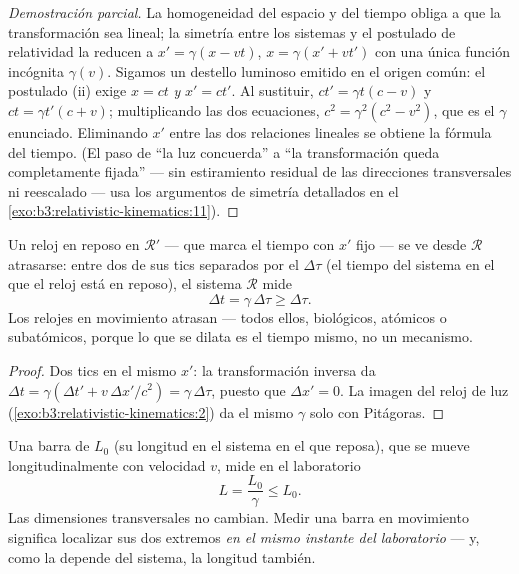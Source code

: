 \begin{proof}[Demostración parcial]
La homogeneidad del espacio y del tiempo obliga a que la transformación sea
lineal; la simetría entre los sistemas y el postulado de relatividad la
reducen a $x' = \gamma(x - vt)$, $x = \gamma(x' + vt')$ con una única
función incógnita $\gamma(v)$. Sigamos un destello luminoso emitido en el
origen común: el postulado (ii) exige $x = ct$ \emph{y} $x' = ct'$. Al
sustituir, $ct' = \gamma t(c - v)$ y $ct = \gamma t'(c + v)$; multiplicando
las dos ecuaciones, $c^2 = \gamma^2(c^2 - v^2)$, que es el $\gamma$
enunciado. Eliminando $x'$ entre las dos relaciones lineales se obtiene la
fórmula del tiempo. (El paso de ``la luz concuerda'' a ``la transformación
queda completamente fijada'' --- sin estiramiento residual de las
direcciones transversales ni reescalado --- usa los argumentos de simetría
detallados en el \cref{exo:b3:relativistic-kinematics:11}).
\end{proof}

\begin{proposition}\label{prop:b3:relativistic-kinematics:dilation}
Un reloj en reposo en $\mathcal R'$ --- que marca el tiempo con $x'$ fijo
--- se ve desde $\mathcal R$ atrasarse: entre dos de sus tics separados por
el \emph{} $\Delta\tau$ (el tiempo del sistema en el que el
reloj está en reposo), el sistema $\mathcal R$ mide
\[
\Delta t = \gamma\,\Delta\tau \ge \Delta\tau .
\]
Los relojes en movimiento atrasan --- todos ellos, biológicos, atómicos o
subatómicos, porque lo que se dilata es el tiempo mismo, no un mecanismo.
\end{proposition}

\begin{proof}
Dos tics en el mismo $x'$: la transformación inversa da $\Delta t
= \gamma(\Delta t' + v\,\Delta x'/c^2) = \gamma\,\Delta\tau$, puesto que
$\Delta x' = 0$. La imagen del reloj de luz
(\cref{exo:b3:relativistic-kinematics:2}) da el mismo $\gamma$ solo con
Pitágoras.
\end{proof}

\begin{proposition}\label{prop:b3:relativistic-kinematics:contraction}
Una barra de \emph{} $L_0$ (su longitud en el sistema en el
que reposa), que se mueve longitudinalmente con velocidad $v$, mide en el
laboratorio
\[
L = \frac{L_0}{\gamma} \le L_0 .
\]
Las dimensiones transversales no cambian. Medir una barra en movimiento
significa localizar sus dos extremos \emph{en el mismo instante del
laboratorio} --- y, como la  depende del sistema, la longitud
también.
\end{proposition}

